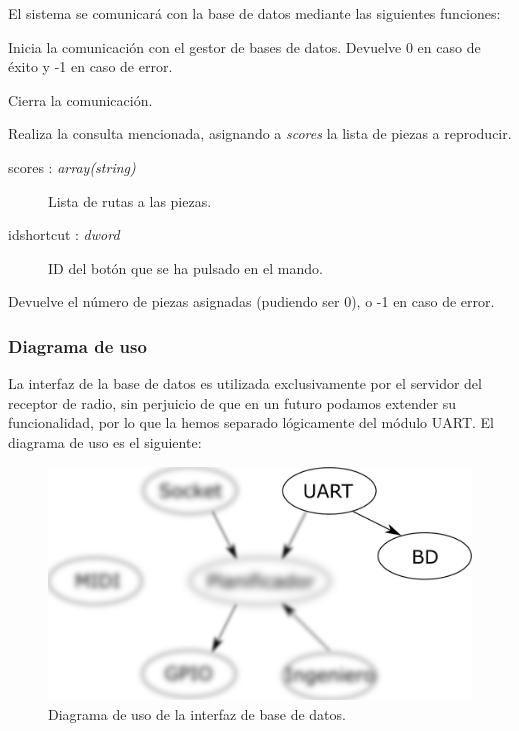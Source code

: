 El sistema se comunicará con la base de datos mediante las siguientes funciones:

\begin{description}[style=nextline]
	\item[db\_init () : \textit{dword}]
	Inicia la comunicación con el gestor de bases de datos. Devuelve 0 en caso de éxito y -1 en caso de error.
	
	\item[db\_destroy ()]
	Cierra la comunicación.
	
	\item[db\_query (scores, idshortcut) : \textit{dword}]
	Realiza la consulta mencionada, asignando a \textit{scores} la lista de piezas a reproducir.
	
	\begin{description}
		\item[scores : \textit{array(string)}] Lista de rutas a las piezas.
		\item[idshortcut : \textit{dword}] ID del botón que se ha pulsado en el mando.
	\end{description}
	
	Devuelve el número de piezas asignadas (pudiendo ser 0), o -1 en caso de error.
	
\end{description}

\subsubsection{Diagrama de uso}

La interfaz de la base de datos es utilizada exclusivamente por el servidor del receptor de radio, sin perjuicio de que en un futuro podamos extender su funcionalidad, por lo que la hemos separado lógicamente del módulo \acrshort{UART}. El diagrama de uso es el siguiente:

\smallskip

\begin{figure}[H]
	\noindent \begin{centering}
		\includegraphics[width=\linewidth/2]{capitulo4/daemon_bd}
		\par\end{centering}
	\smallskip
	\caption{\label{fig:daemon_bd} Diagrama de uso de la interfaz de base de datos.}
\end{figure} 

